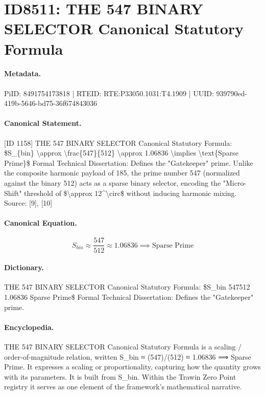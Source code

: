 \section*{ID8511: THE 547 BINARY SELECTOR Canonical Statutory Formula}
\paragraph{Metadata.}
PiID: 8491754173818 | RTEID: RTE:P33050.1031:T4.1909 | UUID: 939790ed-419b-5646-bd75-36f674843036

\paragraph{Canonical Statement.}
[ID 1158] THE 547 BINARY SELECTOR Canonical Statutory Formula: \$S\_\{bin\} \textbackslash{}approx \textbackslash{}frac\{547\}\{512\} \textbackslash{}approx 1.06836 \textbackslash{}implies \textbackslash{}text\{Sparse Prime\}\$ Formal Technical Dissertation: Defines the "Gatekeeper" prime. Unlike the composite harmonic payload of 185, the prime number 547 (normalized against the binary 512) acts as a sparse binary selector, encoding the "Micro-Shift" threshold of \$\textbackslash{}approx 12\textasciicircum{}\textbackslash{}circ\$ without inducing harmonic mixing. Source: [9], [10]

\paragraph{Canonical Equation.}
\[
S_{bin} \approx \frac{547}{512} \approx 1.06836 \implies \text{Sparse Prime}
\]

\paragraph{Dictionary.}
THE 547 BINARY SELECTOR Canonical Statutory Formula: \$S\_bin 547512 1.06836 Sparse Prime\$ Formal Technical Dissertation: Defines the "Gatekeeper" prime.

\paragraph{Encyclopedia.}
THE 547 BINARY SELECTOR Canonical Statutory Formula is a scaling / order-of-magnitude relation, written S\_bin ≈ (547)/(512) ≈ 1.06836 ⟹ Sparse Prime. It expresses a scaling or proportionality, capturing how the quantity grows with its parameters. It is built from S\_bin. Within the Trawin Zero Point registry it serves as one element of the framework's mathematical narrative.
